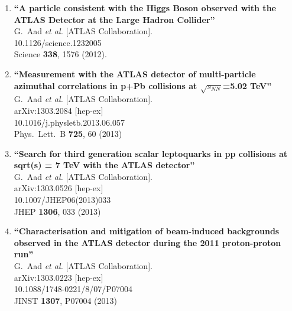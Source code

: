 \documentclass{article}
\begin{document}
\begin{enumerate}
\item%
{\bf ``A particle consistent with the Higgs Boson observed with the ATLAS Detector at the Large Hadron Collider''}
  \\{}G.~Aad {\it et al.}  [ATLAS Collaboration].
    \\{}10.1126/science.1232005
\\{}Science {\bf 338}, 1576 (2012). %


\item%
{\bf ``Measurement with the ATLAS detector of multi-particle azimuthal correlations in p+Pb collisions at $\sqrt{s_{NN}}$=5.02 TeV''}
  \\{}G.~Aad {\it et al.}  [ATLAS Collaboration].
  \\{}arXiv:1303.2084 [hep-ex]
    \\{}10.1016/j.physletb.2013.06.057
\\{}Phys.\ Lett.\ B {\bf 725}, 60 (2013) %


\item%
{\bf ``Search for third generation scalar leptoquarks in pp collisions at sqrt(s) = 7 TeV with the ATLAS detector''}
  \\{}G.~Aad {\it et al.}  [ATLAS Collaboration].
  \\{}arXiv:1303.0526 [hep-ex]
    \\{}10.1007/JHEP06(2013)033
\\{}JHEP {\bf 1306}, 033 (2013) %


\item%
{\bf ``Characterisation and mitigation of beam-induced backgrounds observed in the ATLAS detector during the 2011 proton-proton run''}
  \\{}G.~Aad {\it et al.}  [ATLAS Collaboration].
  \\{}arXiv:1303.0223 [hep-ex]
    \\{}10.1088/1748-0221/8/07/P07004
\\{}JINST {\bf 1307}, P07004 (2013) %



\end{enumerate}
\end{document}
